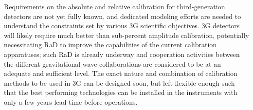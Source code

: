 Requirements on the absolute and relative calibration for third-generation detectors are not yet fully known, and dedicated modeling efforts are needed to understand the constraints set by various \ac{3G}   scientific objectives. \ac{3G}   detectors will likely require much better than sub-percent amplitude calibration, potentially necessitating \ac{RaD}   to improve the capabilities of the current calibration apparatuses; such \ac{RaD}   is already underway and cooperation activities between the different gravitational-wave collaborations are considered to be at an adequate and sufficient level.
The exact nature and combination of calibration methods to be used in \ac{3G}   can be designed soon, but left flexible enough such that the best performing technologies can be installed in the instruments with only a few years lead time before operations.